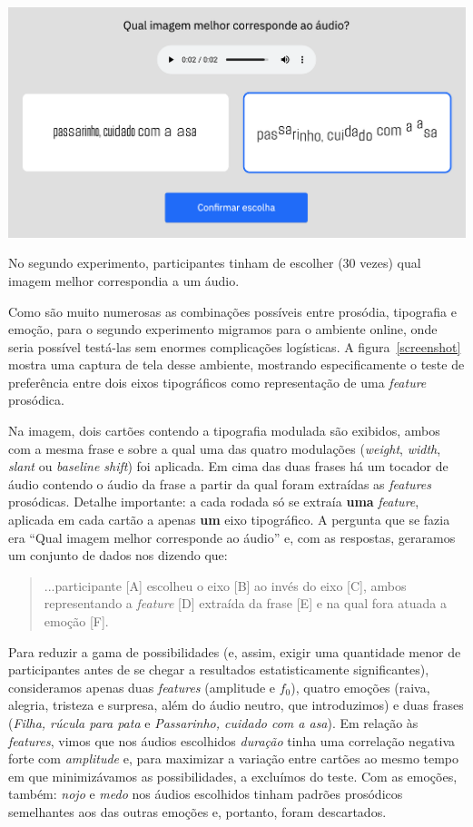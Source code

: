 \documentclass[a4paper]{tufte-handout}
\begin{document}
\begin{marginfigure}[\baselineskip]
  \includegraphics{imgs/test_screenshot2.png}
  \caption{No segundo experimento, participantes tinham de escolher (30 vezes) qual imagem melhor correspondia a um áudio.}
  \label{screenshot}
\end{marginfigure}


Como são muito numerosas as combinações possíveis entre prosódia, tipografia e emoção, para o segundo experimento migramos para o ambiente online, onde seria possível testá-las sem enormes complicações logísticas. A figura~\ref{screenshot} mostra uma captura de tela desse ambiente, mostrando especificamente o teste de preferência entre dois eixos tipográficos como representação de uma \textit{feature} prosódica. 

Na imagem, dois cartões contendo a tipografia modulada são exibidos, ambos com a mesma frase e sobre a qual uma das quatro modulações (\textit{weight}, \textit{width}, \textit{slant} ou \textit{baseline shift}) foi aplicada. Em cima das duas frases há um tocador de áudio contendo o áudio da frase a partir da qual foram extraídas as \textit{features} prosódicas. Detalhe importante: a cada rodada só se extraía \textbf{uma} \textit{feature}, aplicada em cada cartão a apenas \textbf{um} eixo tipográfico. A pergunta que se fazia era ``Qual imagem melhor corresponde ao áudio'' e, com as respostas, geraramos um conjunto de dados nos dizendo que: 

\begin{quote}
    ...participante [A] escolheu o eixo [B] ao invés do eixo [C], ambos representando a \textit{feature} [D] extraída da frase [E] e na qual fora atuada a emoção [F].
\end{quote}

Para reduzir a gama de possibilidades (e, assim, exigir uma quantidade menor de participantes antes de se chegar a resultados estatisticamente significantes), consideramos apenas duas \textit{features} (amplitude e $f_0$), quatro emoções (raiva, alegria, tristeza e surpresa, além do áudio neutro, que introduzimos) e duas frases (\textit{Filha, rúcula para pata} e \textit{Passarinho, cuidado com a asa}). Em relação às \textit{features}, vimos que nos áudios escolhidos \textit{duração} tinha uma correlação negativa forte com \textit{amplitude} e, para maximizar a variação entre cartões ao mesmo tempo em que minimizávamos as possibilidades, a excluímos do teste. Com as emoções, também: \textit{nojo} e \textit{medo} nos áudios escolhidos tinham padrões prosódicos semelhantes aos das outras emoções e, portanto, foram descartados.
\end{document}
